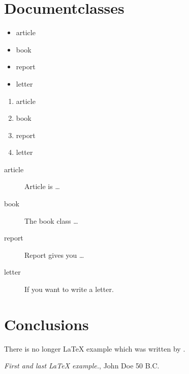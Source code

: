 \documentclass{article}
\begin{document}
\section{Documentclasses} \label{documentclasses}

\begin{itemize}
\item article
\item book
\item report
\item letter
\end{itemize}


\begin{enumerate}
\item article
\item book
\item report
\item letter
\end{enumerate}

\begin{description}
\item[article\label{article}]{Article is \ldots}
\item[book\label{book}]{The book class \ldots}
\item[report\label{report}]{Report gives you \ldots}
\item[letter\label{letter}]{If you want to write a letter.}
\end{description}


\section{Conclusions}\label{conclusions}
There is no longer \LaTeX{} example which was written by \cite{doe}.


\begin{thebibliography}{9}
 \emph{First and last \LaTeX{} example.},
John Doe 50 B.C.
\end{thebibliography}
\end{document}
